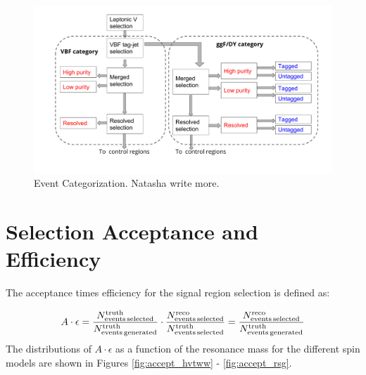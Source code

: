 \begin{figure}[h!]
  \centering
  \includegraphics[width=\hsize]{figures/Analysis/cutflow.pdf}  
  \caption{Event Categorization. Natasha write more.} 

  \label{fig:cutflow}
\end{figure} 
\FloatBarrier

\section{Selection Acceptance and Efficiency}
The acceptance times efficiency for the signal region selection is defined as:

\begin{equation}
A \cdot \epsilon = \frac{N^{\mathrm{truth}}_{\mathrm{events\, selected}}}{N^{\mathrm{truth}}_{\mathrm{events\, generated}}} \cdot \frac{N^{\mathrm{reco}}_{\mathrm{events\, selected}}}{N^{\mathrm{truth}}_{\mathrm{events\, selected}}}
\\
= \frac{N^{\mathrm{reco}}_{\mathrm{events\, selected}}}{N^{\mathrm{truth}}_{\mathrm{events\, generated}}}
\end{equation}
The distributions of $A\cdot \epsilon$ as a function of the resonance mass for the different spin models are shown in Figures \ref{fig:accept_hvtww} - \ref{fig:accept_rsg}.

